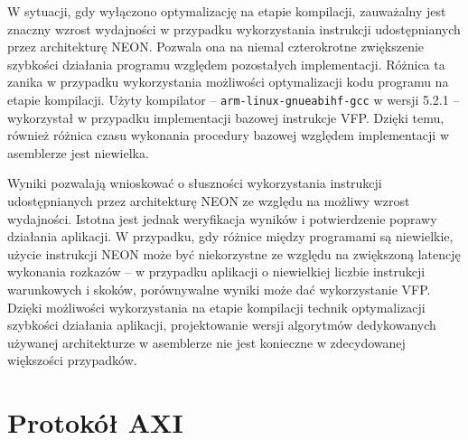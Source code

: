 W sytuacji, gdy wyłączono optymalizację na etapie kompilacji, zauważalny jest znaczny wzrost wydajności w przypadku wykorzystania instrukcji udostępnianych przez architekturę NEON. 
Pozwala ona na niemal czterokrotne zwiększenie szybkości działania programu względem pozostałych implementacji. 
Różnica ta zanika w przypadku wykorzystania możliwości optymalizacji kodu programu na etapie kompilacji. 
Użyty kompilator -- \texttt{arm-linux-gnueabihf-gcc} w wersji 5.2.1 -- wykorzystał w przypadku implementacji bazowej instrukcje VFP. Dzięki temu, również różnica czasu wykonania procedury bazowej względem implementacji w asemblerze jest niewielka.

Wyniki pozwalają wnioskować o słuszności wykorzystania instrukcji udostępnianych przez architekturę NEON ze względu na możliwy wzrost wydajności. Istotna jest jednak weryfikacja wyników i potwierdzenie poprawy działania aplikacji. 
W przypadku, gdy różnice między programami są niewielkie, użycie instrukcji NEON może być niekorzystne ze względu na zwiększoną latencję wykonania rozkazów -- w przypadku aplikacji o niewielkiej liczbie instrukcji warunkowych i skoków, porównywalne wyniki może dać wykorzystanie VFP.
Dzięki możliwości wykorzystania na etapie kompilacji technik optymalizacji szybkości działania aplikacji, projektowanie wersji algorytmów dedykowanych używanej architekturze w asemblerze nie jest konieczne w zdecydowanej większości przypadków.



\section{Protokół AXI}
\label{sec:axi-std}

